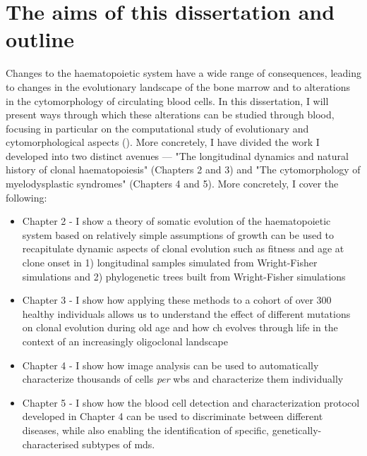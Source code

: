 \section{The aims of this dissertation and outline}

Changes to the haematopoietic system have a wide range of consequences, leading to changes in the evolutionary landscape of the bone marrow and to alterations in the cytomorphology of circulating blood cells. In this dissertation, I will present ways through which these alterations can be studied through blood, focusing in particular on the computational study of evolutionary and cytomorphological aspects (). More concretely, I have divided the work I developed into two distinct avenues --- "The longitudinal dynamics and natural history of clonal haematopoiesis" (Chapters 2 and 3) and "The cytomorphology of myelodysplastic syndromes" (Chapters 4 and 5). More concretely, I cover the following:

\begin{itemize}
	\item Chapter 2 - I show a theory of somatic evolution of the haematopoietic system based on relatively simple assumptions of growth can be used to recapitulate dynamic aspects of clonal evolution such as fitness and age at clone onset in 1) longitudinal samples simulated from Wright-Fisher simulations and 2) phylogenetic trees built from Wright-Fisher simulations
	\item Chapter 3 - I show how applying these methods to a cohort of over 300 healthy individuals allows us to understand the effect of different mutations on clonal evolution during old age and how \ac{ch} evolves through life in the context of an increasingly oligoclonal landscape
	\item Chapter 4 - I show how image analysis can be used to automatically characterize thousands of cells \textit{per} \ac{wbs} and characterize them individually
	\item Chapter 5 - I show how the blood cell detection and characterization protocol developed in Chapter 4 can be used to discriminate between different diseases, while also enabling the identification of specific, genetically-characterised subtypes of \ac{mds}.
\end{itemize}

\begin{figure}[!hb]
  \label{fig:overview}
\end{figure}
